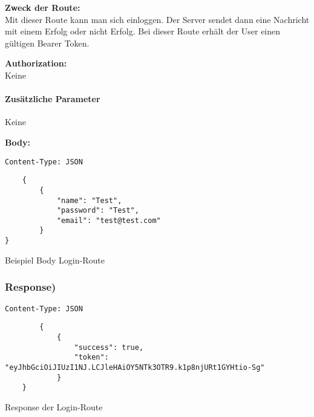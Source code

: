 \textbf{Zweck der Route:} \\
Mit dieser Route kann man sich einloggen. Der Server
sendet dann eine Nachricht mit einem Erfolg oder nicht Erfolg.
Bei dieser Route erhält der User einen gültigen Bearer Token.

\textbf{Authorization:} \\
Keine

\paragraph{Zusätzliche Parameter}
Keine

\textbf{Body:}
\begin{code}
    \lstinline{Content-Type: JSON}
    \begin{lstlisting}
    {
        {
            "name": "Test",
            "password": "Test",
            "email": "test@test.com"
        }  
}
\end{lstlisting}
    \caption{Beispiel Body Login-Route}
\end{code}


\subsubsection{Response)}
\begin{code}
    \lstinline{Content-Type: JSON}
    \begin{lstlisting}
        {
            {
                "success": true,
                "token": "eyJhbGciOiJIUzI1NJ.LCJleHAiOY5NTk3OTR9.k1p8njURt1GYHtio-Sg"
            }
    }
    \end{lstlisting}
    \caption{Response der Login-Route}
\end{code}

\pagebreak